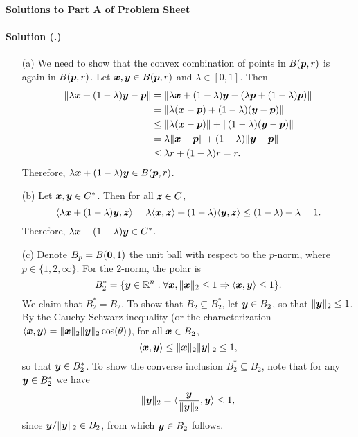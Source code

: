 \documentclass{article}
\newcounter{problemSheetNumber}
\newcounter{problems}
\renewcommand{\solution}[1]{\paragraph{Solution (\theproblemSheetNumber.\theproblems)}\addtocounter{problems}{1}\label{#1}}
\begin{document}
 
\begin{center}
{\Large {\bf Solutions to Part A of Problem Sheet \theproblemSheetNumber}}
\end{center}

\solution{pr:4} 
\begin{itemize}
 \item[(a)] We need to show that the convex combination of points in $B(\bm{p},r)$ is again in $B(\bm{p},r)$. Let $\bm{x},\bm{y}\in B(\bm{p},r)$ and $\lambda\in [0,1]$. Then
 \begin{align*}
  \Vert {\lambda \bm{x}+(1-\lambda)\bm{y}-\bm{p}}\Vert &= \Vert {\lambda \bm{x}+(1-\lambda)\bm{y}-(\lambda \bm{p}+(1-\lambda)\bm{p})}\Vert\\
  &= \Vert {\lambda (\bm{x}-\bm{p})+(1-\lambda)(\bm{y}-\bm{p})}\Vert\\
  &\leq \Vert {\lambda (\bm{x}-\bm{p})}\Vert+\Vert {(1-\lambda)(\bm{y}-\bm{p})}\Vert\\
  &=\lambda\Vert {\bm{x}-\bm{p}}\Vert+(1-\lambda)\Vert {\bm{y}-\bm{p}}\Vert\\
  &\leq \lambda r+(1-\lambda)r = r.
 \end{align*}
Therefore, $\lambda \bm{x}+(1-\lambda)\bm{y}\in B(\bm{p},r)$.
\item[(b)] Let $\bm{x},\bm{y}\in C^*$. Then for all $\bm{z}\in C$,
\begin{equation*}
 \langle {\lambda \bm{x}+(1-\lambda)\bm{y}}, {\bm{z}} \rangle = \lambda\langle { \bm{x}}, {\bm{z}} \rangle+(1-\lambda)\langle {\bm{y}}, {\bm{z}} \rangle\leq (1-\lambda)+\lambda = 1.
\end{equation*}
Therefore, $\lambda \bm{x}+(1-\lambda)\bm{y}\in C^*$.
\item[(c)] Denote $B_p=B(\bm{0},1)$ the unit ball with respect to the $p$-norm, where $p\in \{1,2,\infty\}$. For the $2$-norm, the polar is
\begin{equation*}
 B_2^* = \{\bm{y}\in \mathbb{R}^n \mathrel{\mathop{:}} \forall \bm{x}, \Vert {\bm{x}}\Vert_2\leq 1\Rightarrow \langle {\bm{x}}, {\bm{y}} \rangle\leq 1\}.
\end{equation*}
We claim that $B_2^* = B_2$. To show that $B_2\subseteq B_2^*$, let $\bm{y}\in B_2$, so that $\Vert {\bm{y}}\Vert_2\leq 1$. 
By the Cauchy-Schwarz inequality (or the characterization $\langle {\bm{x}}, {\bm{y}} \rangle=\Vert {\bm{x}}\Vert_2\Vert {\bm{y}}\Vert_2\cos(\theta)$), for all $\bm{x}\in B_2$, 
\begin{equation*}
 \langle {\bm{x}}, {\bm{y}} \rangle\leq \Vert {\bm{x}}\Vert_2\Vert {\bm{y}}\Vert_2\leq 1,
\end{equation*}
so that $\bm{y}\in B_2^*$. To show the converse inclusion $B_2^*\subseteq B_2$, note that for any $\bm{y}\in B_2^*$ we have
\begin{equation*}
 \Vert {\bm{y}}\Vert_2 = \langle {\frac{\bm{y}}{\Vert {\bm{y}}\Vert_2}}, {\bm{y}} \rangle\leq 1,
\end{equation*}
since $\bm{y}/\Vert {\bm{y}}\Vert_2\in B_2$, from which $\bm{y}\in B_2$ follows. 


\end{itemize}
\end{document}
